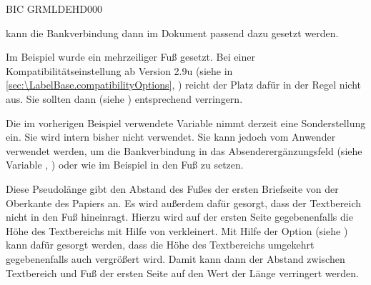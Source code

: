 \begin{Example}
\begin{lstcode}
{                        BIC GRMLDEHD000}
\end{lstcode}
  kann die Bankverbindung dann im Dokument passend dazu gesetzt werden.%
\iffalse%
  \ Abhängig\textnote{Achtung!} von den Voreinstellungen ist ein solch hoher
  Fuß jedoch eventuell nicht vorgesehen und wird deshalb möglicherweise zu
  tief platziert. In einem solchen Fall kann die vertikale Position über die
  Pseudolänge \DescRef{\LabelBase.plength.firstfootvpos}%
  \important{\DescRef{\LabelBase.plength.firstfootvpos}}%
  \IndexPLength{firstfootvpos} angepasst werden (siehe
  \DescPageRef{\LabelBase.plength.firstfootvpos}).%
\fi
\end{Example}

Im Beispiel wurde ein mehrzeiliger Fuß gesetzt. Bei einer
Kompatibilitätseinstellung ab Version
2.9u (siehe
 in
\autoref{sec:\LabelBase.compatibilityOptions},
) reicht der Platz dafür in der Regel
nicht aus. Sie sollten dann  (siehe
) entsprechend
verringern.%
\EndIndexGroup

\begin{Declaration}
\end{Declaration}%
 Die im vorherigen Beispiel
verwendete Variable  nimmt derzeit eine Sonderstellung
ein. Sie wird intern bisher nicht verwendet. Sie kann jedoch vom Anwender
verwendet werden, um die Bankverbindung in das
Absenderergänzungsfeld (siehe Variable ,
) oder wie im Beispiel in den Fuß zu
setzen.%
%
\EndIndexGroup

\begin{Declaration}
\end{Declaration}
Diese Pseudolänge gibt den Abstand des Fußes der ersten Briefseite von der
Oberkante des Papiers an. Es wird außerdem dafür gesorgt, dass der Textbereich
nicht in den Fuß hineinragt. Hierzu wird auf der ersten Seite gegebenenfalls
die Höhe des Textbereichs mit Hilfe von
%
 verkleinert. Mit Hilfe der Option
%
 (siehe
) kann dafür gesorgt werden,
dass die Höhe des Textbereichs umgekehrt gegebenenfalls auch vergrößert
wird. Damit kann dann der Abstand zwischen Textbereich und Fuß der ersten
Seite auf den Wert der Länge
verringert werden.

